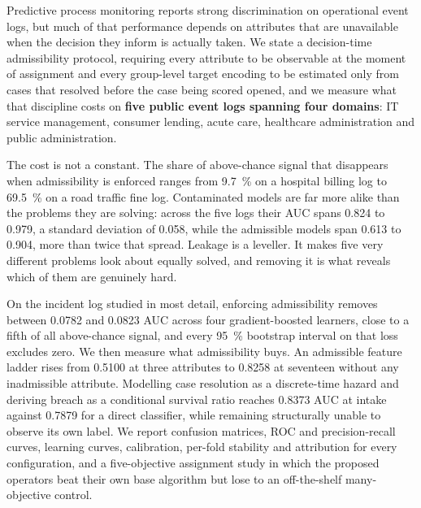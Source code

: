 Predictive process monitoring reports strong discrimination on operational event logs, but
much of that performance depends on attributes that are unavailable when the decision they
inform is actually taken. We state a decision-time admissibility protocol, requiring every
attribute to be observable at the moment of assignment and every group-level target encoding
to be estimated only from cases that resolved before the case being scored opened, and we
measure what that discipline costs on \textbf{five public event logs spanning four domains}:
IT service management, consumer lending, acute care, healthcare administration and public
administration.

The cost is not a constant. The share of above-chance signal that disappears when
admissibility is enforced ranges from \SI{9.7}{\percent} on a hospital billing log to
\SI{69.5}{\percent} on a road traffic fine log. Contaminated models are far more alike than
the problems they are solving: across the five logs their AUC spans \num{0.824} to
\num{0.979}, a standard deviation of \num{0.058}, while the admissible models span
\num{0.613} to \num{0.904}, more than twice that spread. Leakage is a leveller. It makes
five very different problems look about equally solved, and removing it is what reveals
which of them are genuinely hard.

On the incident log studied in most detail, enforcing admissibility removes between
\num{0.0782} and \num{0.0823} AUC across four gradient-boosted learners, close to a fifth of
all above-chance signal, and every \SI{95}{\percent} bootstrap interval on that loss excludes
zero. We then measure what admissibility buys. An admissible feature ladder rises from
\num{0.5100} at three attributes to \num{0.8258} at seventeen without any inadmissible
attribute. Modelling case resolution as a discrete-time hazard and deriving breach as a
conditional survival ratio reaches \num{0.8373} AUC at intake against \num{0.7879} for a
direct classifier, while remaining structurally unable to observe its own label. We report
confusion matrices, ROC and precision-recall curves, learning curves, calibration, per-fold
stability and attribution for every configuration, and a five-objective assignment study in
which the proposed operators beat their own base algorithm but lose to an off-the-shelf
many-objective control.
